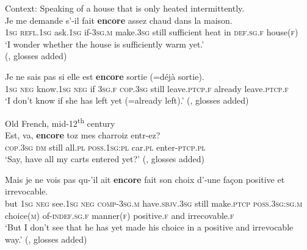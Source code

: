 \begin{exe}
	\ex\label{exAppendixFrenchEncoreInterrogativeYet1}
	Context: Speaking of a house that is only heated intermittently.\\
	\gll Je me demande s'-il fait \textbf{encore} assez chaud dans la maison.\\
	1\textsc{sg} \textsc{refl}.1\textsc{sg} ask.1\textsc{sg} if-3\textsc{sg}.\textsc{m} make.3\textsc{sg} still sufficient heat in \textsc{def}.\textsc{sg}.\textsc{f} house(\textsc{f})\\
	\glt \lq I wonder whether the house is sufficiently warm yet.'
	\\(\cite[178]{Martin1980}, glosses added)

	\ex\label{exAppendixFrenchEncoreInterrogativeYet2}
	\gll Je ne sais pas si elle est \textbf{encore} sortie \textup{(=}déjà sortie\textup{)}.\\
	1\textsc{sg} \textsc{neg} know.1\textsc{sg} \textsc{neg} if 3\textsc{sg}.\textsc{f} \textsc{cop}.3\textsc{sg} still leave.\textsc{ptcp}.\textsc{f} \phantom{(=}already leave.\textsc{ptcp}.\textsc{f}\\
	\glt \lq I don't know if she has left yet (=already left).' (\cite[224]{Muller1991}, glosses added)

	\ex\label{exAppendixFrenchEncoreInterrogativeOld}
	Old French, mid-12\textsuperscript{th} century\\
	\gll Est, va, \textbf{encore} toz mes charroiz entr-ez?\\
	\textsc{cop}.3\textsc{sg} \textsc{dm} still all.\textsc{pl} \textsc{poss}.1\textsc{sg}:\textsc{pl} car.\textsc{pl} enter-\textsc{ptcp}.\textsc{pl}\\
	\glt \lq Say, have all my carts entered yet?\rq{ }(\cite[144]{MosegaardHansen2008}, glosses added)

	\ex\label{exAppendixFrenchEncoreInterrogativeSubordinate}
	\gll Mais je ne vois pas qu-’il ait \textbf{encore} fait son choix d’-une façon positive et irrevocable.\\
	but 1\textsc{sg} \textsc{neg} see.1\textsc{sg} \textsc{neg} \textsc{comp}-3\textsc{sg}.\textsc{m} have.\textsc{sbjv}.3\textsc{sg} still make.\textsc{ptcp} \textsc{poss}.3\textsc{sg}:\textsc{sg}.\textsc{m} choice(\textsc{m}) of-\textsc{indef}.\textsc{sg}.\textsc{f} manner(\textsc{f}) positive.\textsc{f} and irrecovable.\textsc{f}\\
	\glt \lq But I don’t see that he has yet made his choice in a positive and irrevocable way.' (\cite[169]{Martin1980}, glosses added)

\end{exe}

